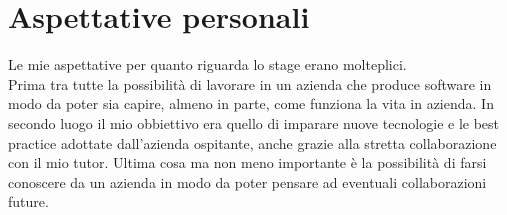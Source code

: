 \section{Aspettative personali}
Le mie aspettative per quanto riguarda lo stage erano molteplici.
\\Prima tra tutte la possibilità di lavorare in un azienda che produce software in modo da poter sia capire, almeno in parte, come funziona la vita in azienda.
In secondo luogo il mio obbiettivo era quello di imparare nuove tecnologie e le best practice adottate dall'azienda ospitante, anche grazie alla stretta collaborazione con il mio tutor.
Ultima cosa ma non meno importante è la possibilità di farsi conoscere da un azienda in modo da poter pensare ad eventuali collaborazioni future.